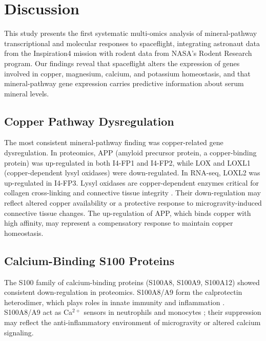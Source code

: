 \documentclass[11pt,a4paper]{article}
\begin{document}
\section{Discussion}

This study presents the first systematic multi-omics analysis of mineral-pathway transcriptional and molecular responses to spaceflight, integrating astronaut data from the Inspiration4 mission with rodent data from NASA's Rodent Research program. Our findings reveal that spaceflight alters the expression of genes involved in copper, magnesium, calcium, and potassium homeostasis, and that mineral-pathway gene expression carries predictive information about serum mineral levels.

\subsection{Copper Pathway Dysregulation}

The most consistent mineral-pathway finding was copper-related gene dysregulation. In proteomics, APP (amyloid precursor protein, a copper-binding protein) was up-regulated in both I4-FP1 and I4-FP2, while LOX and LOXL1 (copper-dependent lysyl oxidases) were down-regulated. In RNA-seq, LOXL2 was up-regulated in I4-FP3. Lysyl oxidases are copper-dependent enzymes critical for collagen cross-linking and connective tissue integrity \citep{smithmungo1998}. Their down-regulation may reflect altered copper availability or a protective response to microgravity-induced connective tissue changes. The up-regulation of APP, which binds copper with high affinity, may represent a compensatory response to maintain copper homeostasis.

\subsection{Calcium-Binding S100 Proteins}

The S100 family of calcium-binding proteins (S100A8, S100A9, S100A12) showed consistent down-regulation in proteomics. S100A8/A9 form the calprotectin heterodimer, which plays roles in innate immunity and inflammation \citep{wang2018}. S100A8/A9 act as Ca$^{2+}$ sensors in neutrophils and monocytes \citep{wang2018}; their suppression may reflect the anti-inflammatory environment of microgravity or altered calcium signaling.
\end{document}
